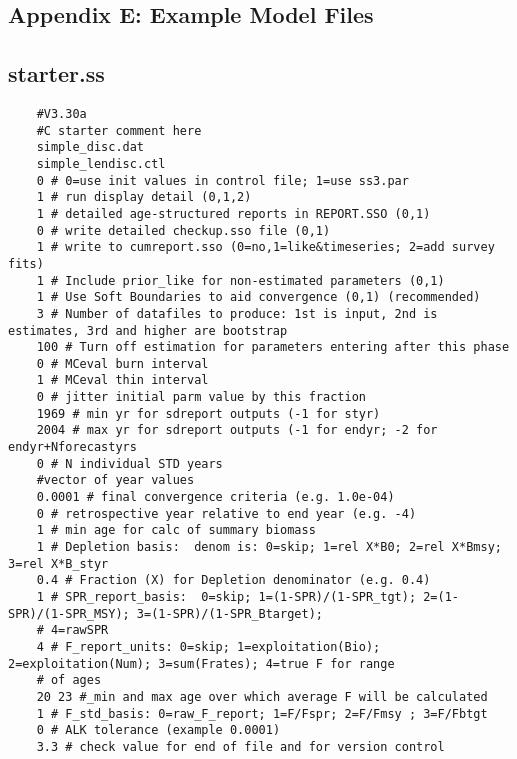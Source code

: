\begin{landscape}

\section{Appendix E: Example Model Files}


\subsection{starter.ss}
\scriptsize{
\begin{verbatim}
	#V3.30a
	#C starter comment here
	simple_disc.dat
	simple_lendisc.ctl
	0 # 0=use init values in control file; 1=use ss3.par
	1 # run display detail (0,1,2)
	1 # detailed age-structured reports in REPORT.SSO (0,1) 
	0 # write detailed checkup.sso file (0,1) 
	1 # write to cumreport.sso (0=no,1=like&timeseries; 2=add survey fits)
	1 # Include prior_like for non-estimated parameters (0,1) 
	1 # Use Soft Boundaries to aid convergence (0,1) (recommended)
	3 # Number of datafiles to produce: 1st is input, 2nd is estimates, 3rd and higher are bootstrap
	100 # Turn off estimation for parameters entering after this phase
	0 # MCeval burn interval
	1 # MCeval thin interval
	0 # jitter initial parm value by this fraction
	1969 # min yr for sdreport outputs (-1 for styr)
	2004 # max yr for sdreport outputs (-1 for endyr; -2 for endyr+Nforecastyrs
	0 # N individual STD years 
	#vector of year values 	
	0.0001 # final convergence criteria (e.g. 1.0e-04) 
	0 # retrospective year relative to end year (e.g. -4)
	1 # min age for calc of summary biomass
	1 # Depletion basis:  denom is: 0=skip; 1=rel X*B0; 2=rel X*Bmsy; 3=rel X*B_styr
	0.4 # Fraction (X) for Depletion denominator (e.g. 0.4)
	1 # SPR_report_basis:  0=skip; 1=(1-SPR)/(1-SPR_tgt); 2=(1-SPR)/(1-SPR_MSY); 3=(1-SPR)/(1-SPR_Btarget);
	# 4=rawSPR
	4 # F_report_units: 0=skip; 1=exploitation(Bio); 2=exploitation(Num); 3=sum(Frates); 4=true F for range 
	# of ages
	20 23 #_min and max age over which average F will be calculated
	1 # F_std_basis: 0=raw_F_report; 1=F/Fspr; 2=F/Fmsy ; 3=F/Fbtgt
	0 # ALK tolerance (example 0.0001)
	3.3 # check value for end of file and for version control
\end{verbatim}
}



\end{landscape}
